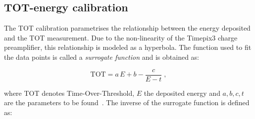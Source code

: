 \begin{table}[htbp]
  \centering
  \caption{Measured baseline mean, threshold DAC step gain, the electronic noise
    and its conversion into energy deposition.}
  \label{tab:THLcalibration_noise}
\end{table}

\subsection{TOT-energy calibration}
\label{sec:EnergyCalibration}

The TOT calibration parametrises the relationship between the energy
deposited and the TOT measurement. Due to the non-linearity of the
Timepix3 charge preamplifier, this relationship is modeled as a
hyperbola. The function used to fit the data points is called a
\textit{surrogate function} and is obtained as:

\begin{equation}
  \text{TOT} = a \, E + b - \frac{c}{E - t} \; ,
  \label{eq:TOTsurrogateFunction}
\end{equation}

where TOT denotes Time-Over-Threshold, $E$ the deposited energy and
$a, b, c, t$ are the parameters to be found~\cite{Jakubek2008155}. The
inverse of the surrogate function is defined as:

